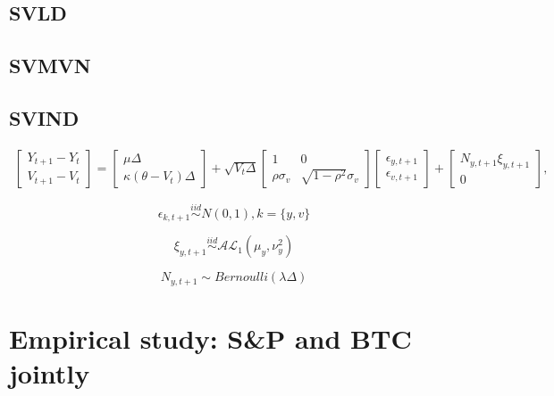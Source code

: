 \documentclass{article}\usepackage[]{graphicx}\usepackage[]{color}
\begin{document}
\subsection{SVLD}

\subsection{SVMVN}

\subsection{SVIND}
\begin{align}
    \begin{bmatrix} Y_{t+1} - Y_t \\ V_{t+1} - V_t \end{bmatrix} = \begin{bmatrix}\mu\Delta \\ \kappa(\theta - V_{t})\Delta\end{bmatrix}  + \sqrt{V_{t}\Delta} \begin{bmatrix} 1 & 0 \\ \rho \sigma_v & \sqrt{1 - \rho^2} \sigma_v \end{bmatrix} \begin{bmatrix} \epsilon_{y,t+1} \\ \epsilon_{v,t+1} \end{bmatrix} + \begin{bmatrix} N_{y,t+1} \xi_{y,t+1} \\0  \end{bmatrix}, \label{S_tdisc}
\end{align}

$$\epsilon_{k,t+1} \overset{iid}{\sim} N(0,1), k = \{y,v\}$$

$$\xi_{y,t+1} \overset{iid}{\sim} \mathcal{AL}_1(\mu_y, \nu_y^2)$$

$$N_{y,t+1} \sim Bernoulli(\lambda\Delta)$$

\newpage
\section{Empirical study: S\&P and BTC jointly}
\end{document}
